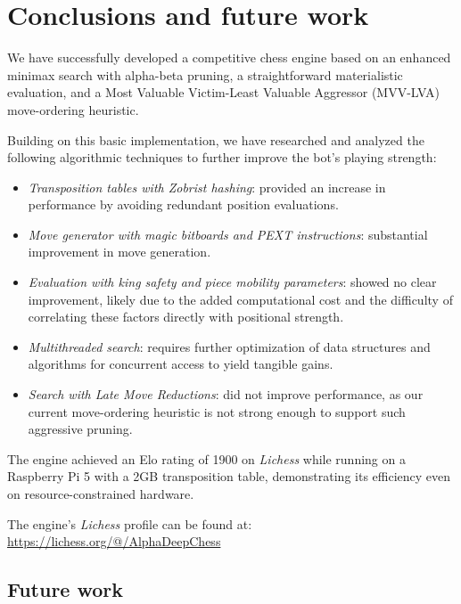 \chapter{Conclusions and future work}

We have successfully developed a competitive chess engine based on an enhanced minimax search with alpha-beta pruning, a straightforward materialistic evaluation, and a Most Valuable Victim-Least Valuable Aggressor (MVV-LVA) move-ordering heuristic.

\vspace{1em}

\noindent Building on this basic implementation, we have researched and analyzed the following algorithmic techniques to further improve the bot's playing strength:

\begin{itemize}[itemsep=1pt]
    \item \textit{Transposition tables with Zobrist hashing}: provided an increase in performance by avoiding redundant position evaluations.
    \item \textit{Move generator with magic bitboards and PEXT instructions}: substantial improvement in move generation.
    \item \textit{Evaluation with king safety and piece mobility parameters}: showed no clear improvement, likely due to the added computational cost and the difficulty of correlating these factors directly with positional strength.
    \item \textit{Multithreaded search}: requires further optimization of data structures and algorithms for concurrent access to yield tangible gains.
    \item \textit{Search with Late Move Reductions}: did not improve performance, as our current move-ordering heuristic is not strong enough to support such aggressive pruning.
\end{itemize}

\noindent The engine achieved an Elo rating of 1900 on \textit{Lichess} while running on a Raspberry Pi 5 with a 2GB transposition table, demonstrating its efficiency even on resource-constrained hardware.

\vspace{1em}

\noindent The engine's \textit{Lichess} profile can be found at:\\
\url{https://lichess.org/@/AlphaDeepChess}


\newpage
\section{Future work}

